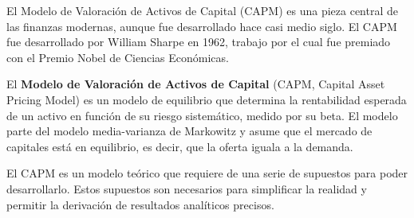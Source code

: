 El Modelo de Valoración de Activos de Capital (CAPM) es una pieza central de las finanzas modernas, aunque fue desarrollado hace casi medio siglo. El CAPM fue desarrollado por William Sharpe en 1962, trabajo por el cual fue premiado con el Premio Nobel de Ciencias Económicas.

\begin{definicion}[CAPM]
El \textbf{Modelo de Valoración de Activos de Capital} (CAPM, Capital Asset Pricing Model) es un modelo de equilibrio que determina la rentabilidad esperada de un activo en función de su riesgo sistemático, medido por su beta. El modelo parte del modelo media-varianza de Markowitz y asume que el mercado de capitales está en equilibrio, es decir, que la oferta iguala a la demanda.
\end{definicion}

El CAPM es un modelo teórico que requiere de una serie de supuestos para poder desarrollarlo. Estos supuestos son necesarios para simplificar la realidad y permitir la derivación de resultados analíticos precisos.

